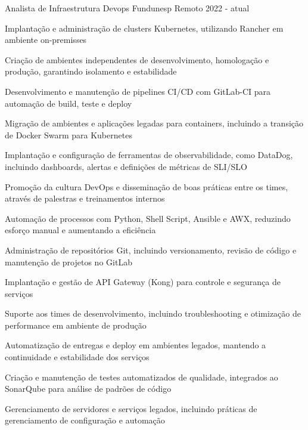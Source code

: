 

\begin{cventries}


\cventry
{Analista de Infraestrutura Devops} %
{Fundunesp} %
{Remoto} %
{2022 - atual} %
{
  \begin{cvitems}
    \item {Implantação e administração de clusters Kubernetes, utilizando Rancher em ambiente on-premisses}
    \item {Criação de ambientes independentes de desenvolvimento, homologação e produção, garantindo isolamento e estabilidade}
    \item {Desenvolvimento e manutenção de pipelines CI/CD com GitLab-CI para automação de build, teste e deploy}
    \item {Migração de ambientes e aplicações legadas para containers, incluindo a transição de Docker Swarm para Kubernetes}
    \item {Implantação e configuração de ferramentas de observabilidade, como DataDog, incluindo dashboards, alertas e definições de métricas de SLI/SLO}
    \item {Promoção da cultura DevOps e disseminação de boas práticas entre os times, através de palestras e treinamentos internos}
    \item {Automação de processos com Python, Shell Script, Ansible e AWX, reduzindo esforço manual e aumentando a eficiência}
    \item {Administração de repositórios Git, incluindo versionamento, revisão de código e manutenção de projetos no GitLab}
    \item {Implantação e gestão de API Gateway (Kong) para controle e segurança de serviços}
    \item {Suporte aos times de desenvolvimento, incluindo troubleshooting e otimização de performance em ambiente de produção}
    \item {Automatização de entregas e deploy em ambientes legados, mantendo a continuidade e estabilidade dos serviços}
    \item {Criação e manutenção de testes automatizados de qualidade, integrados ao SonarQube para análise de padrões de código}
    \item {Gerenciamento de servidores e serviços legados, incluindo práticas de gerenciamento de configuração e automação}
  \end{cvitems}
}


\end{cventries}
